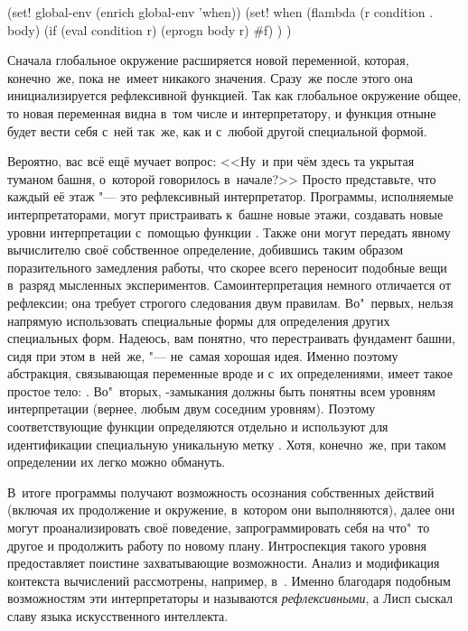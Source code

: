 \begin{code:lisp}
(set! global-env (enrich global-env 'when))
(set! when
      (flambda (r condition . body)
        (if (eval condition r) (eprogn body r) #f) ) )
\end{code:lisp}

Сначала глобальное окружение расширяется новой переменной, которая, конечно~же,
пока не~имеет никакого значения. Сразу~же после этого она инициализируется
рефлексивной функцией. Так как глобальное окружение общее, то новая переменная
видна в~том числе и интерпретатору, и функция  отныне будет вести себя
с~ней так~же, как и с~любой другой специальной формой.

\bigskip

Вероятно, вас всё ещё мучает вопрос: <<Ну~и при чём здесь та укрытая туманом
башня, о~которой говорилось в~начале?>> Просто представьте, что каждый её этаж
"--- это рефлексивный интерпретатор. Программы, исполняемые интерпретаторами,
могут пристраивать к~башне новые этажи, создавать новые уровни интерпретации
с~помощью функции . Также они могут передать явному
вычислителю своё собственное определение, добившись таким образом поразительного
замедления работы, что скорее всего переносит подобные вещи в~разряд мысленных
экспериментов. Самоинтерпретация немного отличается от рефлексии; она требует
строгого следования двум правилам. Во"~первых, нельзя напрямую использовать
специальные формы для определения других специальных форм. Надеюсь, вам понятно,
что перестраивать фундамент башни, сидя при этом в~ней~же, "--- не~самая хорошая
идея. Именно поэтому абстракция, связывающая переменные вроде  и
 с~их определениями, имеет такое простое тело: . Во"~вторых, -замыкания должны быть понятны всем
уровням интерпретации (вернее, любым двум соседним уровням). Поэтому
соответствующие функции определяются отдельно и используют для идентификации
специальную уникальную метку . Хотя, конечно~же, при таком
определении их легко можно обмануть.

В~итоге программы получают возможность осознания собственных действий (включая
их продолжение и окружение, в~котором они выполняются), далее они могут
проанализировать своё поведение, запрограммировать себя на что"~то другое и
продолжить работу по новому плану. Интроспекция такого уровня предоставляет
поистине захватывающие возможности. Анализ и модификация контекста вычислений
рассмотрены, например, в~\cite{que93a}. Именно благодаря подобным возможностям
эти интерпретаторы и называются \emph{рефлексивными}, а Лисп сыскал славу языка
искусственного интеллекта.



